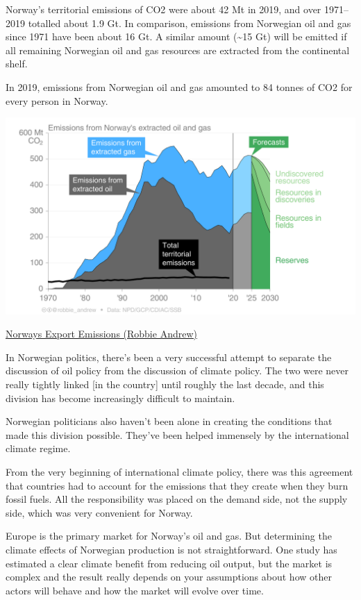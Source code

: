 \documentclass[
]{book}
\begin{document}
Norway's territorial emissions of CO2 were about 42 Mt in 2019, and over 1971--2019 totalled about 1.9 Gt. In comparison, emissions from Norwegian oil and gas since 1971 have been about 16 Gt. A similar amount (\textasciitilde15 Gt) will be emitted if all remaining Norwegian oil and gas resources are extracted from the continental shelf.

In 2019, emissions from Norwegian oil and gas amounted to 84 tonnes of CO2 for every person in Norway.

\includegraphics{fig/Emissions_extracted_Oil_Gas_Norway.png}

\href{https://folk.universitetetioslo.no/roberan/t/export_emissions.shtml}{Norways Export Emissions (Robbie Andrew)}

In Norwegian politics, there's been a very successful attempt to separate the discussion of oil policy from the discussion of climate policy. The two were never really tightly linked {[}in the country{]} until roughly the last decade, and this division has become increasingly difficult to maintain.

Norwegian politicians also haven't been alone in creating the conditions that made this division possible. They've been helped immensely by the international climate regime.

From the very beginning of international climate policy, there was this agreement that countries had to account for the emissions that they create when they burn fossil fuels. All the responsibility was placed on the demand side, not the supply side, which was very convenient for Norway.

Europe is the primary market for Norway's oil and gas. But determining the climate effects of Norwegian production is not straightforward. One study has estimated a clear climate benefit from reducing oil output, but the market is complex and the result really depends on your assumptions about how other actors will behave and how the market will evolve over time.
\end{document}
